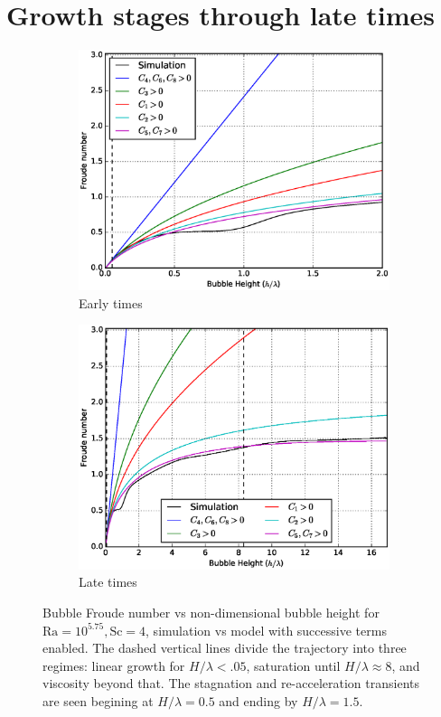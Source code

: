 \section{Growth stages through late times} 

\begin{figure}
\begin{subfigure}[b]{\columnwidth}
\includegraphics[width=\columnwidth]{figs/Cascade-short-4-1}
\caption{Early times}
\end{subfigure}
\begin{subfigure}[b]{\columnwidth}
\includegraphics[width=\columnwidth]{figs/Cascade-4-1}
\caption{Late times}
\end{subfigure}
\caption{ 
Bubble Froude number vs non-dimensional bubble height for $\text{Ra} = 10^{5.75}, \text{Sc} = 4$, simulation vs model with successive terms enabled.
The dashed vertical lines divide the trajectory into three regimes: linear growth for $H/\lambda < .05$, saturation until $H / \lambda \approx 8$, and viscosity beyond that.
The stagnation and re-acceleration transients are seen begining at $H/\lambda = 0.5$ and ending by $H / \lambda = 1.5$.
}
\end{figure}

